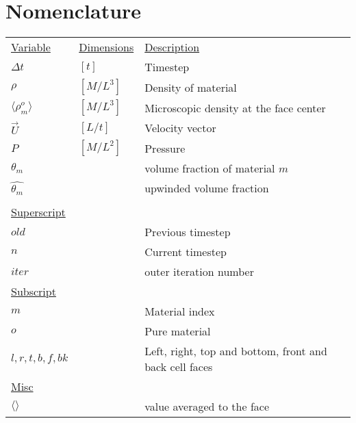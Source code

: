 \documentclass[fleqn]{article}
\newcommand{\rhoM}      {\ensuremath{\rho^{o}_m}}
\newcommand{\rhoMFC}    {\ensuremath{\langle \rhoM \rangle}}
\newcommand{\thetaUW}   {\ensuremath{\widehat{\theta_m}} }
\begin{document}
\section{Nomenclature}
\begin{tabular}{lll}
\\
\underline{Variable} & \underline{Dimensions} & \underline{Description }\\
$\Delta{t}$   &  $[t]$      &    Timestep\\
$\rho$        &  $[M/L^3]$  &    Density of material\\
$\rhoMFC$     &  $[M/L^3]$  &    Microscopic density at the face center\\
$\vec{U}$     &  $[L/t]$    &    Velocity vector\\
$P$           &  $[M/L^2]$ &     Pressure\\ 
$\theta_m$    &             &    volume fraction of material $m$\\
$\thetaUW$    &             &    upwinded volume fraction\\
\\
\textsf{\underline{Superscript}}\\
$old$         &             &    Previous timestep\\
$n$           &             &    Current timestep\\
$iter$        &             &    outer iteration number \\

\textsf{\underline{Subscript}}\\
$m$           &             &    Material index\\
$o$           &             &    Pure material\\
$l,r,t,b,f,bk $       &     &    Left, right, top and bottom, front and back cell faces\\
\textsf{\underline{Misc}}\\
$\langle\rangle$ &          &    value averaged to the face\\
\end{tabular}
\end{document}
